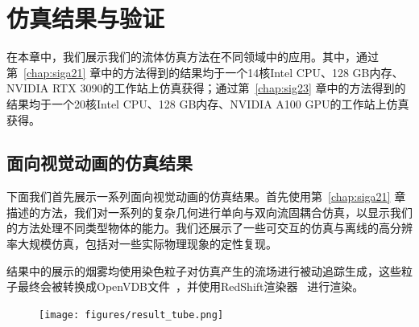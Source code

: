 \chapter{仿真结果与验证}
\label{chap:results}

在本章中，我们展示我们的流体仿真方法在不同领域中的应用。其中，通过第~\ref{chap:siga21} 章中的方法得到的结果均于一个14核Intel CPU、128 GB内存、NVIDIA RTX 3090的工作站上仿真获得；通过第~\ref{chap:sig23} 章中的方法得到的结果均于一个20核Intel CPU、128 GB内存、NVIDIA A100 GPU的工作站上仿真获得。

\section{面向视觉动画的仿真结果}
下面我们首先展示一系列面向视觉动画的仿真结果。首先使用第~\ref{chap:siga21} 章描述的方法，我们对一系列的复杂几何进行单向与双向流固耦合仿真，以显示我们的方法处理不同类型物体的能力。我们还展示了一些可交互的仿真与离线的高分辨率大规模仿真，包括对一些实际物理现象的定性复现。

结果中的展示的烟雾均使用染色粒子对仿真产生的流场进行被动追踪生成，这些粒子最终会被转换成OpenVDB文件~\citep{Museth-2013}，并使用RedShift渲染器~\citep{redshift} 进行渲染。

\begin{figure}[!htbp]
  \centering
    \texttt{[image: figures/result\_tube.png]}
  \label{img:result-tube}
\end{figure}

